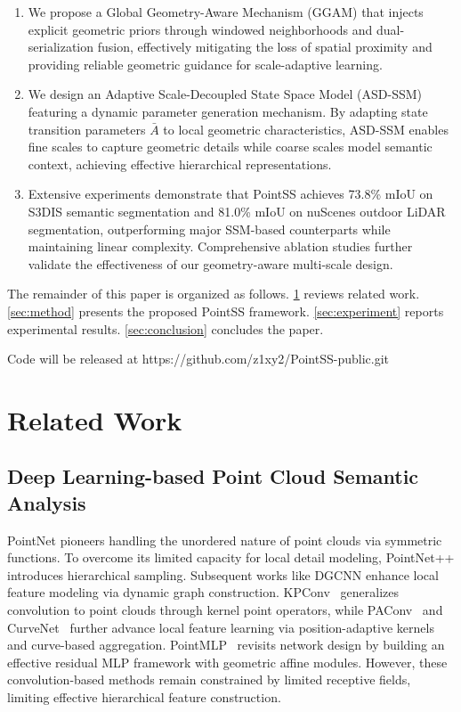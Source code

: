 \documentclass[a4paper,fleqn]{cas-sc}
\begin{document}
\begin{enumerate}
	\item We propose a Global Geometry-Aware Mechanism (GGAM) that injects
	explicit geometric priors through windowed neighborhoods and dual-
	serialization fusion, effectively mitigating the loss of spatial proximity
	and providing reliable geometric guidance for scale-adaptive learning.
	
	\item We design an Adaptive Scale-Decoupled State Space Model (ASD-SSM)
	featuring a dynamic parameter generation mechanism. By adapting state
	transition parameters $\bar{A}$ to local geometric characteristics, ASD-SSM
	enables fine scales to capture geometric details while coarse scales model
	semantic context, achieving effective hierarchical representations.
	
	\item Extensive experiments demonstrate that PointSS achieves 73.8\% mIoU
	on S3DIS semantic segmentation and 81.0\% mIoU on nuScenes outdoor LiDAR segmentation,
	outperforming major SSM-based counterparts while maintaining linear complexity.
	Comprehensive ablation studies further validate the effectiveness of our
	geometry-aware multi-scale design.
\end{enumerate}

The remainder of this paper is organized as follows. \cref{sec:related} reviews related work. \cref{sec:method} presents the proposed PointSS framework. \cref{sec:experiment} reports experimental results. \cref{sec:conclusion} concludes the paper.

Code will be released at https://github.com/z1xy2/PointSS-public.git


\section{Related Work}\label{sec:related}
\subsection{Deep Learning-based Point Cloud Semantic Analysis}
PointNet \cite{pointnet} pioneers handling the unordered nature of point clouds via symmetric functions. To overcome its limited capacity for local detail modeling, PointNet++ \cite{PointNet++} introduces hierarchical sampling. Subsequent works like DGCNN \cite{DGCNN} enhance local feature modeling via dynamic graph construction. KPConv~\cite{KPConv} generalizes convolution to point clouds through kernel point operators, while PAConv~\cite{paconv} and CurveNet~\cite{curvenet} further advance local feature learning via position-adaptive kernels and curve-based aggregation. PointMLP~\cite{pointmlp} revisits network design by building an effective residual MLP framework with geometric affine modules. However, these convolution-based methods remain constrained by limited receptive fields, limiting effective hierarchical feature construction.
\end{document}
